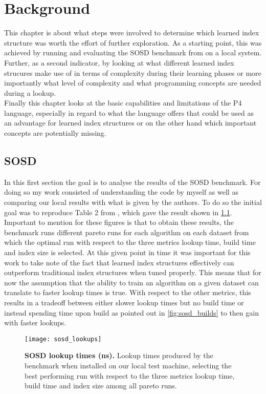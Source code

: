 
\chapter{Background}
\label{ch:background}
This chapter is about what steps were involved to determine which learned index structure was worth the effort of further exploration. As a starting point, this was achieved by running and evaluating the SOSD benchmark from \cite{sosd-neurips} on a local system. Further, as a second indicator, by looking at what different learned index strucures make use of in terms of complexity during their learning phases or more importantly what level of complexity and what programming concepts are needed during a lookup.\\

Finally this chapter looks at the basic capabilities and limitations of the P4 language, especially in regard to what the language offers that could be used as an advantage for learned index structures or on the other hand which important concepts are potentially missing.

\section{SOSD}
In this first section the goal is to analyse the results of the SOSD benchmark. For doing so my work consisted of understanding the code by myself as well as comparing our local results with what is given by the authors. To do so the initial goal was to reproduce Table 2 from \cite{sosd-neurips}, which gave the result shown in \ref{fig:sosd_lookups}. Important to mention for these figures is that to obtain these results, the benchmark runs different pareto runs for each algorithm on each dataset from which the optimal run with respect to the three metrics lookup time, build time and index size is selected. At this given point in time it was important for this work to take note of the fact that learned index structures effectively can outperform traditional index structures when tuned properly. This means that for now the assumption that the ability to train an algorithm on a given dataset can translate to faster lookup times is true. With respect to the other metrics, this results in a tradeoff between either slower lookup times but no build time or instead spending time upon build as pointed out in \ref{fig:sosd_builds} to then gain with faster lookups.

\begin{figure}[ht]
\centering
\texttt{[image: sosd\_lookups]}
\caption[SOSD Lookups]{
  \textbf{SOSD lookup times (ns).}
  Lookup times produced by the benchmark when installed on our local test machine, selecting the best performing run with respect to the three metrics lookup time, build time and index size among all pareto runs.
}
\label{fig:sosd_lookups}
\end{figure}

